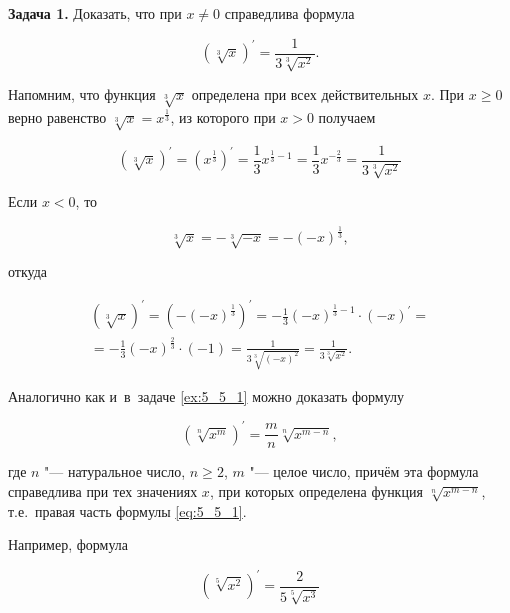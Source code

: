 
\textbf{Задача 1.}\label{ex:5_5_1} Доказать, что при $x \ne 0$ справедлива формула

\begin{equation*}
\displaystyle \left( \sqrt[3]{x} \right)^\prime = \frac{1}{3\sqrt[3]{x^{2}}}.
\end{equation*}

Напомним, что функция $\sqrt[3]{x}$ определена при всех действительных $x$.
При $x \geqslant 0$ верно равенство $\sqrt[3]{x} = x^{\frac{1}{3}}$,
из которого при $x > 0$ получаем

\begin{equation*}
\displaystyle \left( \sqrt[3]{x} \right)^\prime =
\left( x^{\frac{1}{3}} \right)^\prime = 
\frac{1}{3} x^{\frac{1}{3} - 1} =
\frac{1}{3} x^{-\frac{2}{3}} =
\frac{1}{3\sqrt[3]{x^{2}}}
\end{equation*}

Если $x < 0$, то

\begin{equation*}
\sqrt[3]{x} = -\sqrt[3]{-x} = -(-x)^{\frac{1}{3}},
\end{equation*}

\noindent
откуда

\begin{multline*}
\left( \sqrt[3]{x} \right)^\prime = \left( -(-x)^{\frac{1}{3}} \right)^\prime =
-\frac{1}{3}(-x)^{\frac{1}{3} - 1} \cdot (-x)^\prime = \\
= -\frac{1}{3}(-x)^{\frac{2}{3}} \cdot (-1) = \frac{1}{3\sqrt[3]{(-x)^{2}}} = 
\frac{1}{3\sqrt[3]{x^{2}}}.
\end{multline*}

Аналогично как и~в~задаче \ref{ex:5_5_1} можно доказать формулу

\begin{equation}\label{eq:5_5_1}
\displaystyle
\left( \sqrt[n]{x^{m}} \right)^\prime = \frac{m}{n}\sqrt[n]{x^{m - n}},
\end{equation}

\noindent
где $n$ "--- натуральное число, $n \geqslant 2$, $m$ "--- целое число,
причём эта формула справедлива при тех значениях $x$, при которых определена функция
$\sqrt[n]{x^{m - n}}$, т.е.\ правая часть формулы \eqref{eq:5_5_1}.

Например, формула

\begin{equation*}
\displaystyle \left( \sqrt[5]{x^{2}} \right)^\prime = \frac{2}{5\sqrt[5]{x^{3}}}
\end{equation*}

